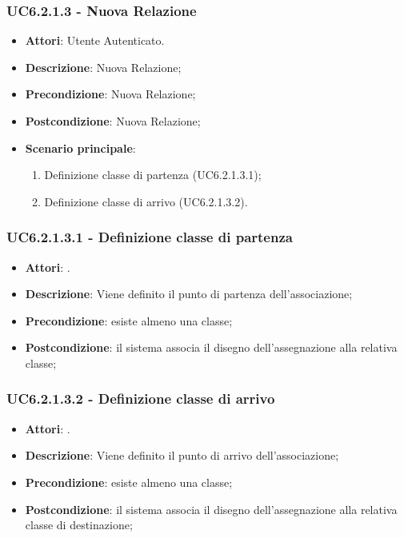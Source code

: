 \subsubsection{UC6.2.1.3 - Nuova Relazione} 
\label{sssec:UC6.2.1.3} 
\begin{itemize} 
\item \textbf{Attori}: Utente Autenticato.
\item \textbf{Descrizione}: Nuova Relazione;
\item \textbf{Precondizione}: Nuova Relazione;
\item \textbf{Postcondizione}: Nuova Relazione;
\item \textbf{Scenario principale}: \begin{enumerate}\item Definizione classe di partenza (UC6.2.1.3.1);\item Definizione classe di arrivo (UC6.2.1.3.2). 
 \end{enumerate}
\end{itemize} 
\subsubsection{UC6.2.1.3.1 - Definizione classe di partenza} 
\label{sssec:UC6.2.1.3.1} 
\begin{itemize} 
\item \textbf{Attori}: .
\item \textbf{Descrizione}: Viene definito il punto di partenza dell'associazione;
\item \textbf{Precondizione}: esiste almeno una classe;
\item \textbf{Postcondizione}: il sistema associa il disegno dell'assegnazione alla relativa classe;
\end{itemize} 
\subsubsection{UC6.2.1.3.2 - Definizione classe di arrivo} 
\label{sssec:UC6.2.1.3.2} 
\begin{itemize} 
\item \textbf{Attori}: .
\item \textbf{Descrizione}: Viene definito il punto di arrivo dell'associazione;
\item \textbf{Precondizione}: esiste almeno una classe;
\item \textbf{Postcondizione}: il sistema associa il disegno dell'assegnazione alla relativa classe di destinazione;
\end{itemize} 
